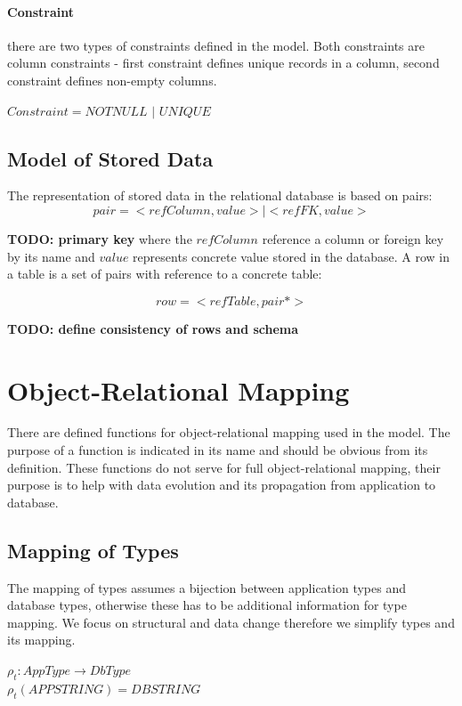\documentclass[11pt]{article}
\begin{document}
\paragraph{Constraint} there are two types of constraints defined in the model. Both constraints are column constraints - first constraint defines unique records in a column, second constraint defines non-empty columns.

\begin{center}
$Constraint = NOTNULL$ $|$ $UNIQUE $
\end{center}

\subsection{Model of Stored Data}
The representation of stored data in the relational database is based on pairs:
$$pair = < refColumn, value > | < refFK, value>$$

\textbf{TODO: primary key}
where the $refColumn$ reference a column or foreign key by its name and $value$ represents concrete value stored in the database. A row in a table is a set of pairs with reference to a concrete table:

$$row = < refTable, pair* >$$

\textbf{TODO: define consistency of rows and schema}


\section{Object-Relational Mapping}
There are defined functions for object-relational mapping used in the model. The purpose of a function is indicated in its name and should be obvious from its definition. These functions do not serve for full object-relational mapping, their purpose is to help with data evolution and its propagation from application to database.


\subsection{Mapping of Types}
The mapping of types assumes a bijection between application types and database types, otherwise these has to be additional information for type mapping. We focus on structural and data change therefore we simplify types and its mapping.

\begin{center}
$ \rho_{t} : AppType \rightarrow DbType $ \\
$ \rho_{t}(APPSTRING) = DBSTRING $
\end{center}
\end{document}
